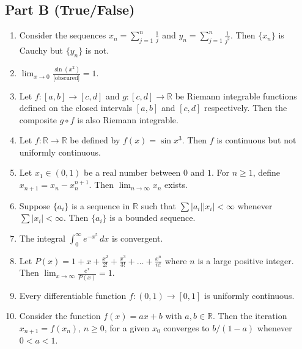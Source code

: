 \documentclass[11pt, a4paper]{article}
\begin{document}
\subsection*{Part B (True/False)}
\begin{enumerate}[resume]
  \item Consider the sequences $x_n = \sum_{j=1}^n \frac{1}{j}$ and $y_n = \sum_{j=1}^n \frac{1}{j^2}$. Then $\{x_n\}$ is Cauchy but $\{y_n\}$ is not.
  \item $\displaystyle \lim_{x \to 0} \frac{\sin(x^2)}{\text{[obscured]}} = 1$.
  \item Let $f: [a, b] \to [c, d]$ and $g: [c, d] \to \mathbb{R}$ be Riemann integrable functions defined on the closed intervals $[a, b]$ and $[c, d]$ respectively. Then the composite $g \circ f$ is also Riemann integrable.
  \item Let $f: \mathbb{R} \to \mathbb{R}$ be defined by $f(x) = \sin x^3$. Then $f$ is continuous but not uniformly continuous.
  \item Let $x_1 \in (0, 1)$ be a real number between $0$ and $1$. For $n \ge 1$, define $x_{n+1} = x_n - x_n^{n+1}$. Then $\lim_{n \to \infty} x_n$ exists.
  \item Suppose $\{a_i\}$ is a sequence in $\mathbb{R}$ such that $\sum |a_i||x_i| < \infty$ whenever $\sum |x_i| < \infty$. Then $\{a_i\}$ is a bounded sequence.
  \item The integral $\displaystyle \int_0^\infty e^{-x^5}\,dx$ is convergent.
  \item Let $P(x) = 1 + x + \frac{x^2}{2!} + \frac{x^3}{3!} + \dots + \frac{x^n}{n!}$ where $n$ is a large positive integer. Then $\lim_{x \to \infty} \frac{e^x}{P(x)} = 1$.
  \item Every differentiable function $f: (0, 1) \to [0, 1]$ is uniformly continuous.
  \item Consider the function $f(x) = ax + b$ with $a, b \in \mathbb{R}$. Then the iteration $x_{n+1} = f(x_n)$, $n \ge 0$, for a given $x_0$ converges to $b/(1 - a)$ whenever $0 < a < 1$.
\end{enumerate}
\end{document}
